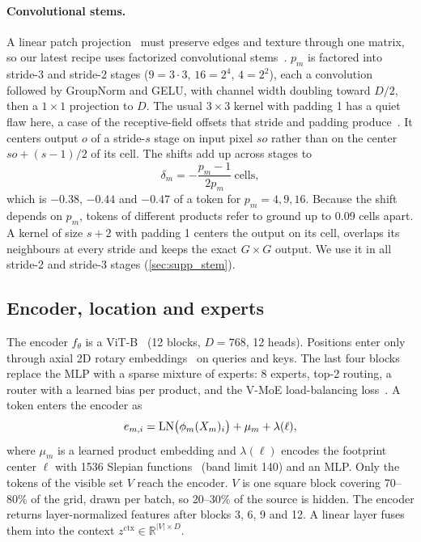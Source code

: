 \paragraph{Convolutional stems.} A linear patch projection~\cite{dosovitskiy2021image} must preserve edges and texture through one matrix, so our latest recipe uses factorized convolutional stems~\cite{xiao2021early}. $p_m$ is factored into stride-3 and stride-2 stages ($9{=}3{\cdot}3$, $16{=}2^4$, $4{=}2^2$), each a convolution followed by GroupNorm and GELU, with channel width doubling toward $D/2$, then a $1\times1$ projection to $D$. The usual $3\times3$ kernel with padding 1 has a quiet flaw here, a case of the receptive-field offsets that stride and padding produce~\cite{araujo2019computing,alsallakh2021mind}. It centers output $o$ of a stride-$s$ stage on input pixel $so$ rather than on the center $so+(s{-}1)/2$ of its cell. The shifts add up across stages to
\begin{equation}
  \delta_m = -\frac{p_m-1}{2p_m}\ \text{cells},
  \label{eq:shift}
\end{equation}
which is $-0.38$, $-0.44$ and $-0.47$ of a token for $p_m = 4, 9, 16$. Because the shift depends on $p_m$, tokens of different products refer to ground up to 0.09 cells apart. A kernel of size $s{+}2$ with padding 1 centers the output on its cell, overlaps its neighbours at every stride and keeps the exact $G\times G$ output. We use it in all stride-2 and stride-3 stages (\cref{sec:supp_stem}).

\subsection{Encoder, location and experts}

The encoder $f_\theta$ is a ViT-B~\cite{dosovitskiy2021image} (12 blocks, $D{=}768$, 12 heads). Positions enter only through axial 2D rotary embeddings~\cite{su2024roformer,heo2024rotary} on queries and keys. The last four blocks replace the MLP with a sparse mixture of experts: 8 experts, top-2 routing, a router with a learned bias per product, and the V-MoE load-balancing loss~\cite{riquelme2021scaling}. A token enters the encoder as
\begin{equation}
  e_{m,i} = \operatorname{LN}\!\big(\phi_m(X_m)_i\big) + \mu_m + \lambda(\ell),
\end{equation}
where $\mu_m$ is a learned product embedding and $\lambda(\ell)$ encodes the footprint center $\ell$ with 1536 Slepian functions~\cite{simons2006spatiospectral,rao2026localized} (band limit 140) and an MLP. Only the tokens of the visible set $V$ reach the encoder. $V$ is one square block covering 70--80\% of the grid, drawn per batch, so 20--30\% of the source is hidden. The encoder returns layer-normalized features after blocks 3, 6, 9 and 12. A linear layer fuses them into the context $z^{\text{ctx}} \in \mathbb{R}^{|V|\times D}$.

